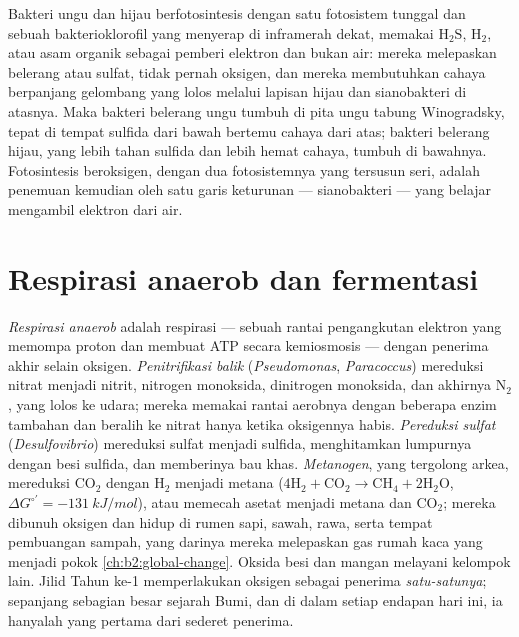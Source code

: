\begin{definition}\label{def:b2:microbial-metabolism:anoxygenic}
Bakteri ungu dan hijau berfotosintesis dengan satu fotosistem tunggal
dan sebuah bakterioklorofil yang menyerap di inframerah dekat, memakai
$\mathrm{H_2S}$, $\mathrm{H_2}$, atau asam organik sebagai pemberi
elektron dan bukan air: mereka melepaskan belerang atau sulfat, tidak
pernah oksigen, dan mereka membutuhkan cahaya berpanjang gelombang yang
lolos melalui lapisan hijau dan sianobakteri di atasnya. Maka bakteri
belerang ungu tumbuh di pita ungu tabung Winogradsky, tepat di tempat
sulfida dari bawah bertemu cahaya dari atas; bakteri belerang hijau,
yang lebih tahan sulfida dan lebih hemat cahaya, tumbuh di bawahnya.
Fotosintesis beroksigen, dengan dua fotosistemnya yang tersusun seri,
adalah penemuan kemudian oleh satu garis keturunan --- sianobakteri ---
yang belajar mengambil elektron dari air.
\end{definition}

\section{Respirasi anaerob dan fermentasi}

\begin{definition}\label{def:b2:microbial-metabolism:anaerobic}
\emph{Respirasi anaerob} adalah respirasi --- sebuah rantai
pengangkutan elektron yang memompa proton dan membuat ATP secara
kemiosmosis --- dengan penerima akhir selain oksigen.
\emph{Penitrifikasi balik} (\emph{Pseudomonas}, \emph{Paracoccus})
mereduksi nitrat menjadi nitrit, nitrogen monoksida, dinitrogen
monoksida, dan akhirnya $\mathrm{N_2}$, yang lolos ke udara; mereka
memakai rantai aerobnya dengan beberapa enzim tambahan dan beralih ke
nitrat hanya ketika oksigennya habis. \emph{Pereduksi sulfat}
(\emph{Desulfovibrio}) mereduksi sulfat menjadi sulfida, menghitamkan
lumpurnya dengan besi sulfida, dan memberinya bau khas.
\emph{Metanogen}, yang tergolong arkea, mereduksi $\mathrm{CO_2}$
dengan $\mathrm{H_2}$ menjadi metana ($4\mathrm{H_2} + \mathrm{CO_2} \to \mathrm{CH_4} +
2\mathrm{H_2O}$, $\Delta G^{\circ\prime} = \qty{-131}{kJ/mol}$), atau
memecah asetat menjadi metana dan
$\mathrm{CO_2}$; mereka dibunuh oksigen dan hidup di rumen sapi, sawah,
rawa, serta tempat pembuangan sampah, yang darinya mereka melepaskan
gas rumah kaca yang menjadi pokok \cref{ch:b2:global-change}. Oksida
besi dan mangan melayani kelompok lain. Jilid Tahun ke-1 memperlakukan
oksigen sebagai penerima \emph{satu-satunya}; sepanjang sebagian besar
sejarah Bumi, dan di dalam setiap endapan hari ini, ia hanyalah yang
pertama dari sederet penerima.
\end{definition}

